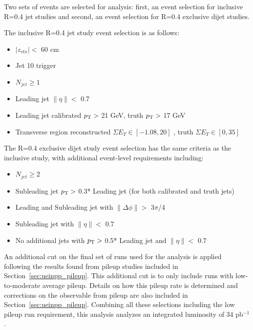Two sets of events are selected for analysis: first, an event selection for inclusive R=0.4 jet studies and second, an event selection for R=0.4 exclusive dijet studies.

The inclusive R=0.4 jet study event selection is as follows: 
\begin{itemize}
    \item $|z_{vtx}| <$ 60 cm
    \item Jet 10 trigger
    \item $N_{jet} \geq 1$
    \item Leading jet $\|\eta\| <$ 0.7
    \item Leading jet calibrated $\mbox{$p_{\text{T}}$} >$ 21 GeV, truth $\mbox{$p_{\text{T}}$} >$ 17 GeV
    \item Transverse region reconstructed $\Sigma E_{T} \in [-1.08, 20]$ \GeV, truth $\Sigma E_{T} \in [0, 35]$ \GeV{}
\end{itemize}

The R=0.4 exclusive dijet study event selection has the same criteria as the inclusive study, with additional event-level requirements including: 
\begin{itemize}
    \item $N_{jet} \geq 2$
    \item Subleading jet $\mbox{$p_{\text{T}}$} >$ 0.3* Leading jet \pT{} (for both calibrated and truth jets)
    \item Leading and Subleading jet with $\|\Delta\phi\| >$ 3$\pi$/4
    \item Subleading jet with $\|\eta\| <$ 0.7
    \item No additional jets with $\mbox{$p_{\text{T}}$} >$ 0.5* Leading jet \pT{} and $\|\eta\| <$ 0.7
\end{itemize}

An additional cut on the final set of runs used for the analysis is applied following the results found from pileup studies included in Section~\ref{sec:ueinpp_pileup}. 
This additional cut is to only include runs with low-to-moderate average pileup. 
Details on how this pileup rate is determined and corrections on the observable from pileup are also included in Section~\ref{sec:ueinpp_pileup}.
Combining all these selections including the low pileup run requirement, this analysis analyzes an integrated luminosity of 34 pb$^{-1}$. 
